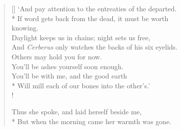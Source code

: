 \begin{verse}[\versewidth]
`And pay attention to the entreaties of the departed.\\*
\vin If word gets back from the dead, it must be worth\\ \vin \vin knowing.\\
Daylight keeps us in chains; night sets us free,\\
\vin And \emph{Cerberus} only watches the backs of his six eyelids.\\
Others may hold you for now.\\
\vin You'll be ashes yourself soon enough.\\
You'll be with me, and the good earth\\*
\vin Will mill each of our bones into the other's.'\\!

Thus she spoke, and laid herself beside me,\\*
\vin But when the morning came her warmth was gone.
\end{verse}
